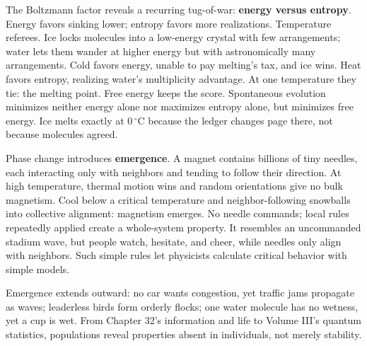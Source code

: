 The Boltzmann factor reveals a recurring tug-of-war: \textbf{energy versus entropy}. Energy favors sinking lower; entropy favors more realizations. Temperature referees. Ice locks molecules into a low-energy crystal with few arrangements; water lets them wander at higher energy but with astronomically many arrangements. Cold favors energy, unable to pay melting's tax, and ice wins. Heat favors entropy, realizing water's multiplicity advantage. At one temperature they tie: the melting point. Free energy keeps the score. Spontaneous evolution minimizes neither energy alone nor maximizes entropy alone, but minimizes free energy. Ice melts exactly at \(0\,^\circ\mathrm{C}\) because the ledger changes page there, not because molecules agreed.

Phase change introduces \textbf{emergence}. A magnet contains billions of tiny needles, each interacting only with neighbors and tending to follow their direction. At high temperature, thermal motion wins and random orientations give no bulk magnetism. Cool below a critical temperature and neighbor-following snowballs into collective alignment: magnetism emerges. No needle commands; local rules repeatedly applied create a whole-system property. It resembles an uncommanded stadium wave, but people watch, hesitate, and cheer, while needles only align with neighbors. Such simple rules let physicists calculate critical behavior with simple models.

\begin{center}
\end{center}

Emergence extends outward: no car wants congestion, yet traffic jams propagate as waves; leaderless birds form orderly flocks; one water molecule has no wetness, yet a cup is wet. From Chapter 32's information and life to Volume III's quantum statistics, populations reveal properties absent in individuals, not merely stability.

